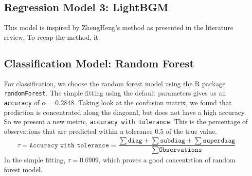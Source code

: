 \documentclass{article}
\begin{document}
\subsection{Regression Model 3: LightBGM}
This model is inspired by ZhengHeng's method as presented in the literature review.
To recap the method, it 

\subsection{Classification Model: Random Forest}
For classification, we choose the random forest model using the R package \texttt{randomForest}.
The simple fitting using the default parameters gives us an \texttt{accuracy} of $\alpha = 0.2848$. 
Taking look at the confusion matrix, we found that prediction is concentrated along the diagonal, 
but does not have a high accuracy. So we present a new metric, \texttt{accuracy with tolerance}. 
This is the percentage of observations that are predicted within a tolerance $0.5$ of the true value.
\begin{align*}
    \tau = \texttt{Accuracy with tolerance} = \dfrac{\sum \texttt{diag} + \sum \texttt{subdiag} + \sum \texttt{superdiag}}{\sum \texttt{Observations}}
\end{align*}
In the simple fitting, $\tau = 0.6909$, which proves a good concentrtion of random forest model. 
\end{document}
